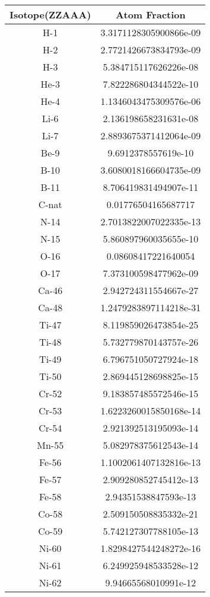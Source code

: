 \begin{table}[h!]
\centering
\begin{tabular}{|| c || c |}
\hline
Isotope(ZZAAA) & Atom Fraction \\
\hline \hline

H-1 & 3.3171128305900866e-09 \\
H-2 & 2.7721426673834793e-09 \\
H-3 & 5.384715117626226e-08 \\
He-3 & 7.822286804344522e-10 \\
He-4 & 1.1346043475309576e-06 \\
Li-6 & 2.136198658231631e-08 \\
Li-7 & 2.8893675371412064e-09 \\
Be-9 & 9.6912378557619e-10 \\
B-10 & 3.6080018166604735e-09 \\
B-11 & 8.706419831494907e-11 \\
C-nat & 0.01776504165687717 \\
N-14 & 2.7013822007022335e-13 \\
N-15 & 5.860897960035655e-10 \\
O-16 & 0.08608417221640054 \\
O-17 & 7.373100598477962e-09 \\
Ca-46 & 2.942724311554667e-27 \\
Ca-48 & 1.2479283897114218e-31 \\
Ti-47 & 8.119859026473854e-25 \\
Ti-48 & 5.732779870143757e-26 \\
Ti-49 & 6.796751050727924e-18 \\
Ti-50 & 2.869445128698825e-15 \\
Cr-52 & 9.183857485572546e-15 \\
Cr-53 & 1.6223260015850168e-14 \\
Cr-54 & 2.921392513195093e-14 \\
Mn-55 & 5.082978375612543e-14 \\
Fe-56 & 1.1002061407132816e-13 \\
Fe-57 & 2.909280852745412e-13 \\
Fe-58 & 2.94351538847593e-13 \\
Co-58 & 2.509150508835332e-21 \\
Co-59 & 5.742127307788105e-13 \\
Ni-60 & 1.8298427544248272e-16 \\
Ni-61 & 6.249925948533528e-12 \\
Ni-62 & 9.94665568010991e-12 \\

\end{tabular}
\end{table}
